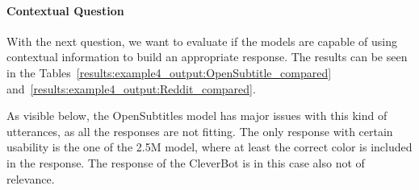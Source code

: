\paragraph{Contextual Question} 
With the next question, we want to evaluate if the models are capable of using contextual information to build an appropriate response. The results can be seen in the Tables~\ref{results:example4_output:OpenSubtitle_compared} and~\ref{results:example4_output:Reddit_compared}.

As visible below, the OpenSubtitles model has major issues with this kind of utterances, as all the responses are not fitting. The only response with certain usability is the one of the 2.5M model, where at least the correct color is included in the response. The response of the CleverBot is in this case also not of relevance.

